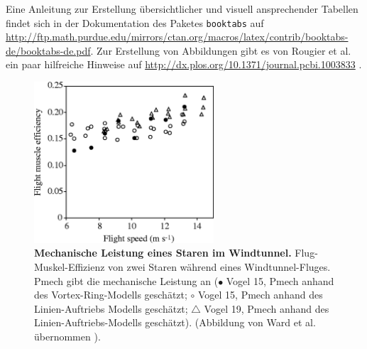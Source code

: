 \documentclass{scrreprt}
\begin{document}
Eine Anleitung zur Erstellung übersichtlicher und visuell ansprechender Tabellen findet sich in der Dokumentation des Paketes \verb|booktabs| auf \url{http://ftp.math.purdue.edu/mirrors/ctan.org/macros/latex/contrib/booktabs-de/booktabs-de.pdf}. Zur Erstellung von Abbildungen gibt es von Rougier et al. ein paar hilfreiche Hinweise auf \url{http://dx.plos.org/10.1371/journal.pcbi.1003833} \cite{Rougier2014}. 
\vspace*{0.6cm}

\begin{figure}[htpb] %
	{\centering
		\includegraphics[height=6cm]{abbildungen/Starling_Mechpower.jpg} 
		\caption[Mechanische Leistung eines Staren im Windtunnel]{
			\textbf{Mechanische Leistung eines Staren im Windtunnel.} 
			Flug-Muskel-Effizienz von zwei Staren während eines Windtunnel-Fluges. Pmech gibt die mechanische Leistung an ($\bullet$ Vogel 15, Pmech anhand des Vortex-Ring-Modells geschätzt; $\circ$ Vogel 15, Pmech anhand des Linien-Auftriebs Modells geschätzt; $\triangle$ Vogel 19, Pmech anhand des Linien-Auftriebs-Modells geschätzt). (Abbildung von Ward et al. übernommen  \cite{Ward2001}).
			}
		\label{fig:beispielabbildung}
	}
\end{figure}
\end{document}

